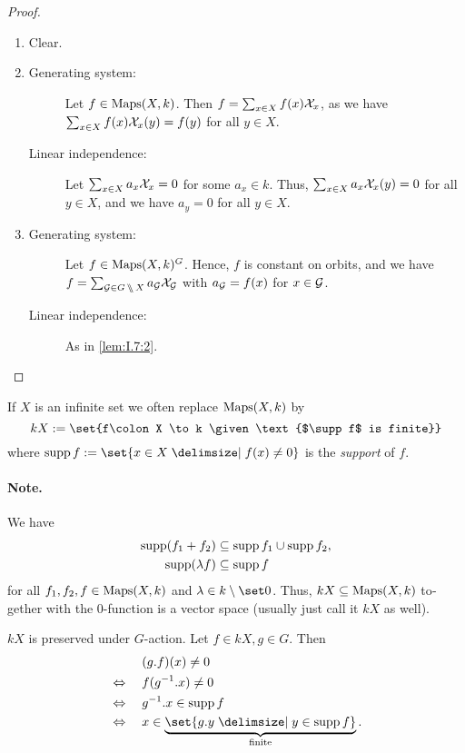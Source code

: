 \documentclass[12pt,a4paper]{scrartcl}
\theoremstyle{cplain}
\theoremstyle{cplain}
\theoremstyle{cplain}
\theoremstyle{definition}
\begin{document}
\begin{otherlanguage}{english}
\begin{proof}
  \leavevmode
  \begin{enumerate}[label=\ref{lem:I.7:\arabic*}]
    \item Clear.
    \item \begin{description}
            \item[Generating system:] Let $f \in \operatorname{Maps}(X,k)$. Then $f= \sum_{x\in X}f(x)\mathcal{X}_x$, as we have $\sum_{x\in X}f(x)\mathcal{X}_x(y) = f(y)$ for all $y \in X$.
            \item[Linear independence:] Let $\sum_{x \in X} a_x\mathcal{X}_x = 0$ for some $a_x \in k$. Thus, $\sum_{x \in X} a_x\mathcal{X}_x(y) = 0$ for all $y \in X$, and we have $a_y = 0$ for all $y \in X$.
          \end{description}
    \item \begin{description}
            \item[Generating system:] Let $f \in \operatorname{Maps}(X,k)^G$. Hence, $f$ is constant on orbits, and we have $f = \sum_{\mathcal{G} \in G\,\backslash\!\!\backslash\, X} a_{\mathcal{G}} \mathcal{X}_{\mathcal{G}}$ with $a_{\mathcal{G}} = f(x)$ for $x \in \mathcal{G}$.
            \item[Linear independence:] As in \ref{lem:I.7:2}.
            \qedhere
          \end{description}
  \end{enumerate}
\end{proof}

If $X$ is an infinite set we often replace $\operatorname{Maps}(X,k)$ by \[kX := \set{f\colon X \to k \given \text{$\supp f$ is finite}} \] where $\supp f := \set{ x \in X \given f(x) \neq 0}$ is the \emph{support} of $f$.

\paragraph{Note.}
We have
\begin{align*}
  \operatorname{supp}(f_1+f_2) &\subseteq \operatorname{supp} f_1 \cup \operatorname{supp} f_2, \\
  \operatorname{supp}(\lambda f) &\subseteq \operatorname{supp} f
\end{align*}
for all $f_1,f_2,f\in \operatorname{Maps}(X,k)$ and $\lambda \in k\setminus \set0$. Thus, $kX \subseteq \operatorname{Maps}(X,k)$ together with the $0$-function is a vector space (usually just call it $kX$ as well).

$kX$ is preserved under $G$-action. Let $f \in kX, g \in G$. Then 
\begin{align*}
  &\phantom{{}\Leftrightarrow{}}\quad (g.f)(x) \neq 0 \\
  &\Leftrightarrow\quad f(g^{-1} .x ) \neq 0 \\
  &\Leftrightarrow\quad g^{-1}.x \in \supp f\\
  &\Leftrightarrow\quad x \in \underbrace{\set{g.y \given y \in \supp f}}_{\text{finite}}.
\end{align*}


\end{otherlanguage}
\end{document}

